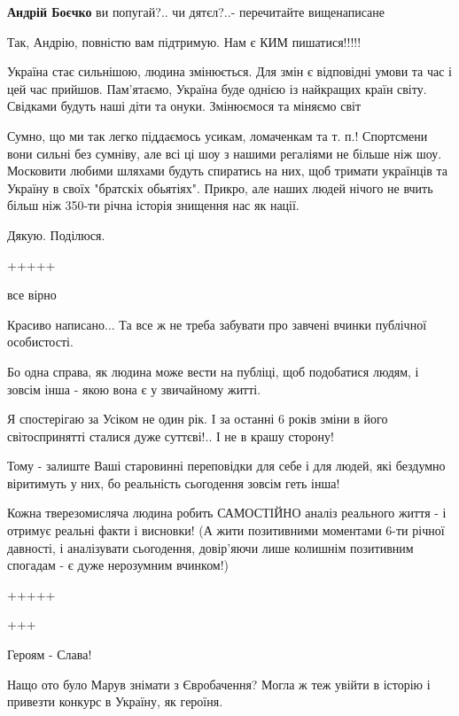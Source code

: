 \begin{itemize}
\begin{itemize}
\textbf{Андрій Боєчко} ви попугай?.. чи дятєл?..- перечитайте вищенаписане
\end{itemize} %

Так, Андрію, повністю вам підтримую. Нам є КИМ пишатися!!!!!


Україна стає сильнішою, людина змінюється. Для змін є відповідні умови та час і
цей час прийшов. Пам'ятаємо, Україна буде однією із найкращих країн світу.
Свідками будуть наші діти та онуки. Змінюємося та міняємо світ



Сумно, що ми так легко піддаємось усикам, ломаченкам та т. п.! Спортсмени вони
сильні без сумніву, але всі ці шоу з нашими регаліями не більше ніж шоу.
Московити любими шляхами будуть спиратись на них, щоб тримати українців та
Україну в своїх "братскіх обьятіях". Прикро, але наших людей нічого не вчить
більш ніж 350-ти річна історія знищення нас як нації.

Дякую. Поділюся.

+++++

все вірно


Красиво написано... Та все ж не треба забувати про завчені вчинки публічної
особистості.

Бо одна справа, як людина може вести на публіці, щоб подобатися людям, і зовсім
інша - якою вона є у звичайному житті.

Я спостерігаю за Усіком не один рік. І за останні 6 років зміни в його
світоспринятті сталися дуже суттєві!.. І не в крашу сторону!

Тому - залиште Ваші старовинні переповідки для себе і для людей, які бездумно
віритимуть у них, бо реальність сьогодення зовсім геть інша!

Кожна тверезомисляча людина робить САМОСТІЙНО аналіз реального життя - і
отримує реальні факти і висновки! (А жити позитивними моментами 6-ти річної
давності, і аналізувати сьогодення, довір'яючи лише колишнім позитивним
спогадам - є дуже нерозумним вчинком!)

+++++

+++

Героям - Слава!

Нащо ото було Марув знімати з Євробачення? Могла ж теж увійти в історію і привезти конкурс в Україну, як героїня.


\end{itemize}
